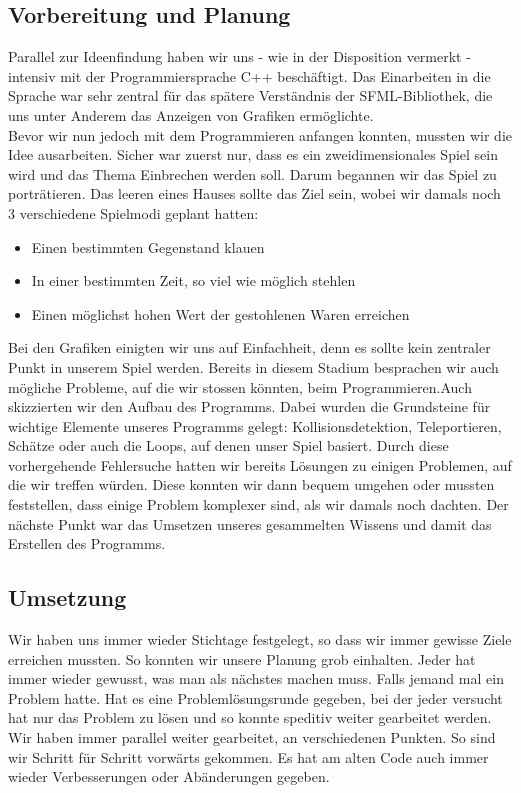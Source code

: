 \documentclass[11pt,a4paper]{scrbook}
\begin{document}
\subsection{Vorbereitung und Planung}
Parallel zur Ideenfindung haben wir uns - wie in der
Disposition vermerkt - intensiv mit der Programmiersprache C++ beschäftigt. Das Einarbeiten
in die Sprache war sehr zentral für das spätere Verständnis der SFML-Bibliothek, die uns
unter Anderem das Anzeigen von Grafiken ermöglichte.
\\
Bevor wir nun jedoch mit dem Programmieren anfangen konnten, mussten wir die Idee ausarbeiten.
Sicher war zuerst nur, dass es ein zweidimensionales Spiel sein wird und das Thema Einbrechen werden soll.
Darum begannen wir das Spiel zu porträtieren. 
Das leeren eines Hauses sollte das Ziel sein, wobei wir damals noch 3 verschiedene Spielmodi geplant hatten:
\begin{itemize}
\item Einen bestimmten Gegenstand klauen
\item In einer bestimmten Zeit, so viel wie möglich stehlen
\item Einen möglichst hohen Wert der gestohlenen Waren erreichen
\end{itemize}
Bei den Grafiken einigten wir uns auf Einfachheit, denn es sollte kein zentraler Punkt in unserem Spiel werden.
Bereits in diesem Stadium besprachen wir auch mögliche Probleme, auf die wir stossen könnten, beim Programmieren.Auch skizzierten wir den Aufbau des Programms.
Dabei wurden die Grundsteine für wichtige Elemente unseres Programms gelegt: Kollisionsdetektion, Teleportieren, Schätze oder auch die Loops, auf denen unser Spiel basiert. 
Durch diese vorhergehende Fehlersuche hatten wir bereits Lösungen zu einigen Problemen, auf die wir treffen würden. Diese konnten wir dann bequem umgehen oder mussten feststellen, dass einige Problem komplexer sind, als wir damals noch dachten.
Der nächste Punkt war das Umsetzen unseres gesammelten Wissens und damit das Erstellen des Programms.

\subsection{Umsetzung}
Wir haben uns immer wieder Stichtage festgelegt, so dass wir immer gewisse Ziele erreichen mussten. So konnten wir unsere Planung grob einhalten. Jeder hat immer wieder gewusst, was man als nächstes machen muss. Falls jemand mal ein Problem hatte. Hat es eine Problemlösungsrunde gegeben, bei der jeder versucht hat nur das Problem zu lösen und so konnte speditiv weiter gearbeitet werden. Wir haben immer parallel weiter gearbeitet, an verschiedenen Punkten. So sind wir Schritt für Schritt vorwärts gekommen. Es hat am alten Code auch immer wieder Verbesserungen oder Abänderungen gegeben. 
\end{document}
